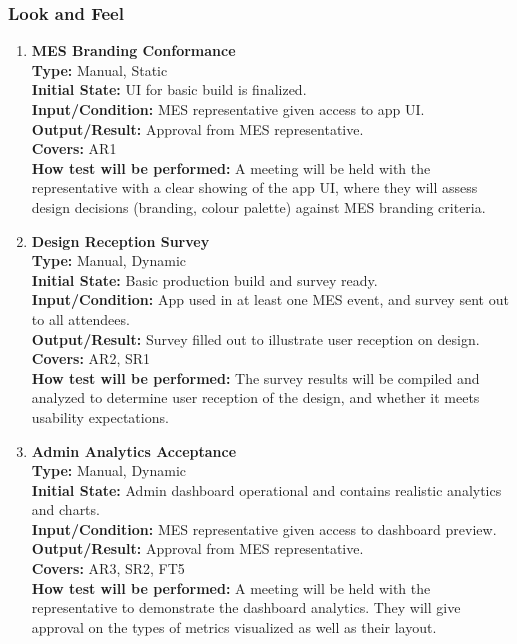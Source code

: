\documentclass[12pt, titlepage]{article}
\begin{document}
\subsubsection{Look and Feel}
\begin{enumerate}[label=\bfseries LF-\arabic*:, wide=0pt]
  \item \label{test-LF1} \textbf{MES Branding Conformance}\\[2mm]
    {\bf Type:} Manual, Static\\
    {\bf Initial State:} UI for basic build is finalized.\\
    {\bf Input/Condition:} MES representative given access to app UI.\\
    {\bf Output/Result:} Approval from MES representative.\\
    {\bf Covers:} AR1\\
    {\bf How test will be performed:} A meeting will be held with the representative with a clear showing of the app UI, where they will assess design decisions (branding, colour palette) against MES branding criteria.

  \item \label{test-LF2} \textbf{Design Reception Survey}\\[2mm]
    {\bf Type:} Manual, Dynamic\\
    {\bf Initial State:} Basic production build and survey ready.\\
    {\bf Input/Condition:} App used in at least one MES event, and survey sent out to all attendees.\\
    {\bf Output/Result:} Survey filled out to illustrate user reception on design.\\
    {\bf Covers:} AR2, SR1\\
    {\bf How test will be performed:} The survey results will be compiled and analyzed to determine user reception of the design, and whether it meets usability expectations.

    \item \label{test-LF3} \textbf{Admin Analytics Acceptance}\\[2mm]
    {\bf Type:} Manual, Dynamic\\
    {\bf Initial State:} Admin dashboard operational and contains realistic analytics and charts.\\
    {\bf Input/Condition:} MES representative given access to dashboard preview.\\
    {\bf Output/Result:} Approval from MES representative.\\
    {\bf Covers:} AR3, SR2, FT5\\
    {\bf How test will be performed:} A meeting will be held with the representative to demonstrate the dashboard analytics. They will give approval on the types of metrics visualized as well as their layout.
\end{enumerate}
\end{document}
